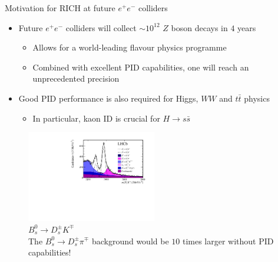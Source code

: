 \documentclass{beamer}
\begin{document}
\begin{frame}{Motivation for RICH at future $e^+e^-$ colliders}
  \begin{itemize}
    \setlength\itemsep{0.7em}
    \item{Future $e^+e^-$ colliders will collect ${\sim}10^{12}$ $Z$ boson decays in $4$ years}
    \begin{itemize}
      \item{Allows for a world-leading flavour physics programme}
      \item{Combined with excellent PID capabilities, one will reach an unprecedented precision}
    \end{itemize}
    \item{Good PID performance is also required for Higgs, $WW$ and $t\bar{t}$ physics}
    \begin{itemize}
      \item{In particular, kaon ID is crucial for $H\to s\bar{s}$}
    \end{itemize}
  \end{itemize}
  \begin{figure}
    \centering
    \vspace{-0.2cm}
    \includegraphics[height = 4cm]{Plots/LHCb_BsDsK.pdf}
    \caption{$B_s^0\to D_s^\pm K^\mp$\\The $B_s^0\to D_s^\pm\pi^\mp$ background would be $10$ times larger without PID capabilities!}
  \end{figure}
\end{frame}
\end{document}
